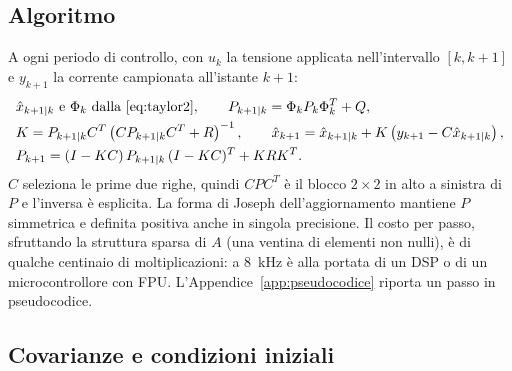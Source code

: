 \documentclass[10pt,a4paper]{scrartcl}
\newcommand{\xh}{\hat{x}}
\begin{document}
\begin{onehalfspace}
\subsection{Algoritmo}
\label{sec:algoritmo}

A ogni periodo di controllo, con $u_k$ la tensione applicata nell'intervallo $[k, k+1]$ e $y_{k+1}$ la corrente campionata all'istante $k+1$:
\begin{align}
&\xh_{k+1|k} \text{ e } \Phi_k \text{ dalla \eqref{eq:taylor2}}, \qquad P_{k+1|k} = \Phi_k P_k \Phi_k^T + Q, \nonumber\\
&K = P_{k+1|k}C^T\left(C P_{k+1|k} C^T + R\right)^{-1}, \qquad \xh_{k+1} = \xh_{k+1|k} + K\left(y_{k+1} - C\xh_{k+1|k}\right), \label{eq:kalman}\\
&P_{k+1} = (I - KC)\,P_{k+1|k}\,(I - KC)^T + K R K^T. \nonumber
\end{align}
$C$ seleziona le prime due righe, quindi $CPC^T$ è il blocco $2\times2$ in alto a sinistra di $P$ e l'inversa è esplicita. La forma di Joseph dell'aggiornamento mantiene $P$ simmetrica e definita positiva anche in singola precisione. Il costo per passo, sfruttando la struttura sparsa di $A$ (una ventina di elementi non nulli), è di qualche centinaio di moltiplicazioni: a \SI{8}{kHz} è alla portata di un DSP o di un microcontrollore con FPU. L'Appendice~\ref{app:pseudocodice} riporta un passo in pseudocodice.

\subsection{Covarianze e condizioni iniziali}
\label{sec:covarianze}


\end{onehalfspace}
\end{document}
